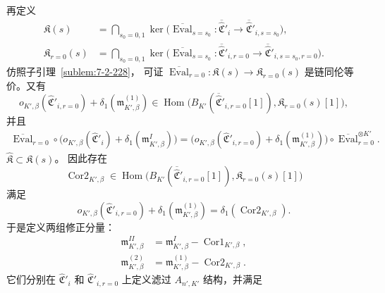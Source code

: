 再定义
\[
\begin{aligned}
\mathfrak K(s)
&=\bigcap_{s_0=0,1}
\ker\bigl(
\overline{\operatorname{Eval}}_{s=s_0}\colon
\overline{\widehat{\mathfrak C}}'_i
\to\overline{\widehat{\mathfrak C}}'_{i,s=s_0}
\bigr),\\
\mathfrak K_{r=0}(s)
&=\bigcap_{s_0=0,1}
\ker\bigl(
\overline{\operatorname{Eval}}_{s=s_0}\colon
\overline{\widehat{\mathfrak C}}'_{i,r=0}
\to\overline{\widehat{\mathfrak C}}'_{i,s=s_0,r=0}
\bigr).
\end{aligned}
\]
仿照子引理~\ref{sublem:7-2-228}，
可证
$\overline{\operatorname{Eval}}_{r=0}\colon
\mathfrak K(s)\to\mathfrak K_{r=0}(s)$
是链同伦等价。又有
\[
o_{K',\beta}(\widehat{\mathfrak C}'_{i,r=0})
+\delta_1(\mathfrak m^{(1)}_{K',\beta})
\in\operatorname{Hom}\bigl(
B_{K'}(\overline{\widehat{\mathfrak C}}'_{i,r=0}[1]),
\mathfrak K_{r=0}(s)[1]
\bigr),
\]
并且
\[
\begin{aligned}
\overline{\operatorname{Eval}}_{r=0}\circ
\bigl(o_{K',\beta}(\widehat{\mathfrak C}'_i)
+\delta_1(\mathfrak m^I_{K',\beta})\bigr)
=\bigl(
o_{K',\beta}(\widehat{\mathfrak C}'_{i,r=0})
+\delta_1(\mathfrak m^{(1)}_{K',\beta})
\bigr)\circ
\overline{\operatorname{Eval}}_{r=0}^{\otimes K'}.
\end{aligned}
\]
$\widehat{\mathfrak K}\subset\mathfrak K(s)$。
因此存在
\[
\operatorname{Cor2}_{K',\beta}
\in\operatorname{Hom}\bigl(
B_{K'}(\overline{\widehat{\mathfrak C}}'_{i,r=0}[1]),
\mathfrak K_{r=0}(s)[1]
\bigr)
\]
满足
\[
o_{K',\beta}(\widehat{\mathfrak C}'_{i,r=0})
+\delta_1(\mathfrak m^{(1)}_{K',\beta})
=\delta_1(\operatorname{Cor2}_{K',\beta}).
\]
于是定义两组修正分量：
\[
\begin{aligned}
\mathfrak m^{II}_{K',\beta}
&=\mathfrak m^I_{K',\beta}
-\operatorname{Cor1}_{K',\beta},\\
\mathfrak m^{(2)}_{K',\beta}
&=\mathfrak m^{(1)}_{K',\beta}
-\operatorname{Cor2}_{K',\beta}.
\end{aligned}
\]
它们分别在 $\widehat{\mathfrak C}'_i$
和 $\widehat{\mathfrak C}'_{i,r=0}$
上定义滤过 $A_{n',K'}$ 结构，并满足
